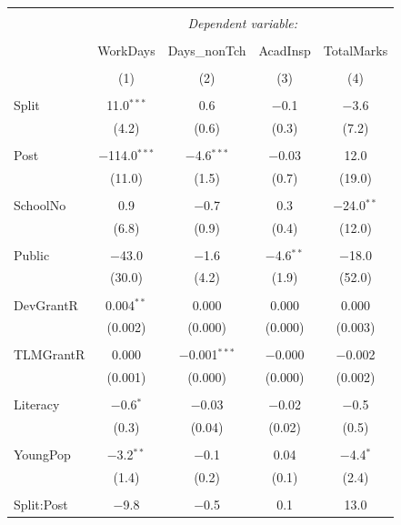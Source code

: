 \documentclass[12pt, a4paper]{article}
\begin{document}
\begin{table}[!htbp] \centering 
  \caption{} 
  \label{} 
\begin{tabular}{@{\extracolsep{5pt}}lcccc} 
\\[-1.8ex]\hline 
\hline \\[-1.8ex] 
 & \multicolumn{4}{c}{\textit{Dependent variable:}} \\ 
\cline{2-5} 
\\[-1.8ex] & WorkDays & Days\_nonTch & AcadInsp & TotalMarks \\ 
\\[-1.8ex] & (1) & (2) & (3) & (4)\\ 
\hline \\[-1.8ex] 
 Split & 11.0$^{***}$ & 0.6 & $-$0.1 & $-$3.6 \\ 
  & (4.2) & (0.6) & (0.3) & (7.2) \\ 
  & & & & \\ 
 Post & $-$114.0$^{***}$ & $-$4.6$^{***}$ & $-$0.03 & 12.0 \\ 
  & (11.0) & (1.5) & (0.7) & (19.0) \\ 
  & & & & \\ 
 SchoolNo & 0.9 & $-$0.7 & 0.3 & $-$24.0$^{**}$ \\ 
  & (6.8) & (0.9) & (0.4) & (12.0) \\ 
  & & & & \\ 
 Public & $-$43.0 & $-$1.6 & $-$4.6$^{**}$ & $-$18.0 \\ 
  & (30.0) & (4.2) & (1.9) & (52.0) \\ 
  & & & & \\ 
 DevGrantR & 0.004$^{**}$ & 0.000 & 0.000 & 0.000 \\ 
  & (0.002) & (0.000) & (0.000) & (0.003) \\ 
  & & & & \\ 
 TLMGrantR & 0.000 & $-$0.001$^{***}$ & $-$0.000 & $-$0.002 \\ 
  & (0.001) & (0.000) & (0.000) & (0.002) \\ 
  & & & & \\ 
 Literacy & $-$0.6$^{*}$ & $-$0.03 & $-$0.02 & $-$0.5 \\ 
  & (0.3) & (0.04) & (0.02) & (0.5) \\ 
  & & & & \\ 
 YoungPop & $-$3.2$^{**}$ & $-$0.1 & 0.04 & $-$4.4$^{*}$ \\ 
  & (1.4) & (0.2) & (0.1) & (2.4) \\ 
  & & & & \\ 
 Split:Post & $-$9.8 & $-$0.5 & 0.1 & 13.0 \\ 

\end{tabular}
\end{table}
\end{document}
